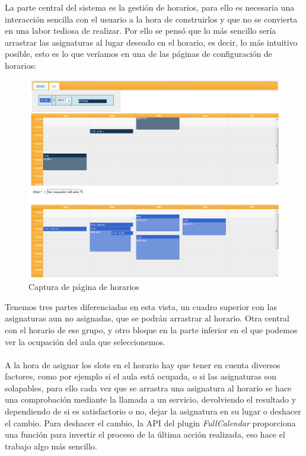 \documentclass[a4paper,11pt]{article} %
\begin{document}
La parte central del sistema es la gestión de horarios, para ello es necesaria una interacción sencilla con el usuario a la hora de construirlos y que no se convierta en una labor tediosa de realizar. Por ello se pensó que lo más sencillo sería arrastrar las asignaturas al lugar deseado en el horario, es decir, lo más intuitivo posible, esto es lo que veríamos en una de las páginas de configuración de horarios:

\begin{figure}[H] 
  \label{captura-horarios} 
	\begin{center}
    \includegraphics[scale=0.57]{./edit-horario.png}
  \end{center}
\caption{Captura de página de horarios}
\end{figure}

Tenemos tres partes diferenciadas en esta vista, un cuadro superior con las asignaturas aun no asignadas, que se podrán arrastrar al horario. Otra central con el horario de ese grupo, y otro bloque en la parte inferior en el que podemos ver la ocupación del aula que seleccionemos.
\paragraph{}
A la hora de asignar los slots en el horario hay que tener en cuenta diversos factores, como por ejemplo si el aula está ocupada, o si las asignaturas son solapables, para ello cada vez que se arrastra una asignatura al horario se hace una comprobación mediante la llamada a un servicio, devolviendo el resultado y dependiendo de si es satisfactorio o no, dejar la asignatura en su lugar o deshacer el cambio. Para deshacer el cambio, la API del plugin {\em FullCalendar} proporciona una función para invertir el proceso de la última acción realizada, eso hace el trabajo algo más sencillo.
\end{document}
